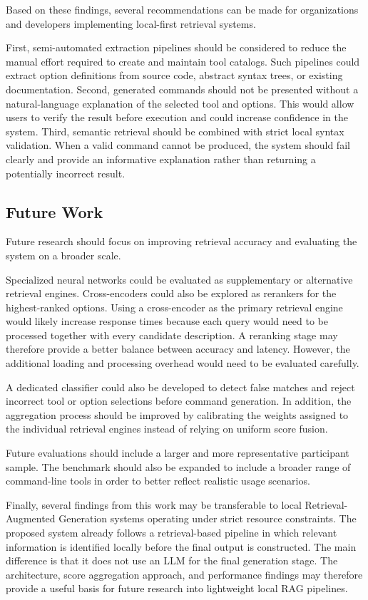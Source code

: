 Based on these findings, several recommendations can be made for organizations and developers implementing local-first retrieval systems.

First, semi-automated extraction pipelines should be considered to reduce the manual effort required to create and maintain tool catalogs. Such pipelines could extract option definitions from source code, abstract syntax trees, or existing documentation. Second, generated commands should not be presented without a natural-language explanation of the selected tool and options. This would allow users to verify the result before execution and could increase confidence in the system. Third, semantic retrieval should be combined with strict local syntax validation. When a valid command cannot be produced, the system should fail clearly and provide an informative explanation rather than returning a potentially incorrect result.

\subsection{Future Work}

Future research should focus on improving retrieval accuracy and evaluating the system on a broader scale.

Specialized neural networks could be evaluated as supplementary or alternative retrieval engines. Cross-encoders could also be explored as rerankers for the highest-ranked options. Using a cross-encoder as the primary retrieval engine would likely increase response times because each query would need to be processed together with every candidate description. A reranking stage may therefore provide a better balance between accuracy and latency. However, the additional loading and processing overhead would need to be evaluated carefully.

A dedicated classifier could also be developed to detect false matches and reject incorrect tool or option selections before command generation. In addition, the aggregation process should be improved by calibrating the weights assigned to the individual retrieval engines instead of relying on uniform score fusion.

Future evaluations should include a larger and more representative participant sample. The benchmark should also be expanded to include a broader range of command-line tools in order to better reflect realistic usage scenarios.

Finally, several findings from this work may be transferable to local Retrieval-Augmented Generation systems operating under strict resource constraints. The proposed system already follows a retrieval-based pipeline in which relevant information is identified locally before the final output is constructed. The main difference is that it does not use an \ac{LLM} for the final generation stage. The architecture, score aggregation approach, and performance findings may therefore provide a useful basis for future research into lightweight local RAG pipelines.